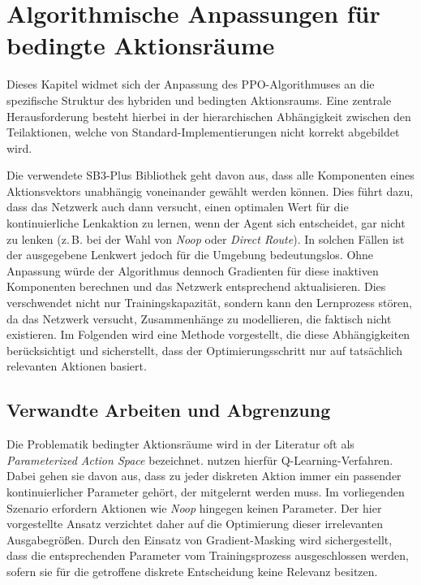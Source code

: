 \chapter{Algorithmische Anpassungen für bedingte Aktionsräume}
\label{ch:ppo_bedingt}

Dieses Kapitel widmet sich der Anpassung des \ac{PPO}-Algorithmuses an die spezifische Struktur des hybriden und bedingten Aktionsraums. Eine zentrale Herausforderung besteht hierbei in der hierarchischen Abhängigkeit zwischen den Teilaktionen, welche von Standard-Implementierungen nicht korrekt abgebildet wird.
\medskip

Die verwendete \ac{SB3}-Plus Bibliothek geht davon aus, dass alle Komponenten eines Aktionsvektors unabhängig voneinander gewählt werden können. Dies führt dazu, dass das Netzwerk auch dann versucht, einen optimalen Wert für die kontinuierliche Lenkaktion zu lernen, wenn der Agent sich entscheidet, gar nicht zu lenken (z.\,B. bei der Wahl von \emph{Noop} oder \emph{Direct Route}). In solchen Fällen ist der ausgegebene Lenkwert jedoch für die Umgebung bedeutungslos.
Ohne Anpassung würde der Algorithmus dennoch Gradienten für diese inaktiven Komponenten berechnen und das Netzwerk entsprechend aktualisieren. Dies verschwendet nicht nur Trainingskapazität, sondern kann den Lernprozess stören, da das Netzwerk versucht, Zusammenhänge zu modellieren, die faktisch nicht existieren. Im Folgenden wird eine Methode vorgestellt, die diese Abhängigkeiten berücksichtigt und sicherstellt, dass der Optimierungsschritt nur auf tatsächlich relevanten Aktionen basiert.
\medskip

\section{Verwandte Arbeiten und Abgrenzung}

Die Problematik bedingter Aktionsräume wird in der Literatur oft als \textit{Parameterized Action Space} bezeichnet. \citet{masson2016reinforcement} nutzen hierfür Q-Learning-Verfahren. Dabei gehen sie davon aus, dass zu jeder diskreten Aktion immer ein passender kontinuierlicher Parameter gehört, der mitgelernt werden muss. 
Im vorliegenden Szenario erfordern Aktionen wie \emph{Noop} hingegen keinen Parameter. Der hier vorgestellte Ansatz verzichtet daher auf die Optimierung dieser irrelevanten Ausgabegrößen. Durch den Einsatz von Gradient-Masking wird sichergestellt, dass die entsprechenden Parameter vom Trainingsprozess ausgeschlossen werden, sofern sie für die getroffene diskrete Entscheidung keine Relevanz besitzen.
\medskip

